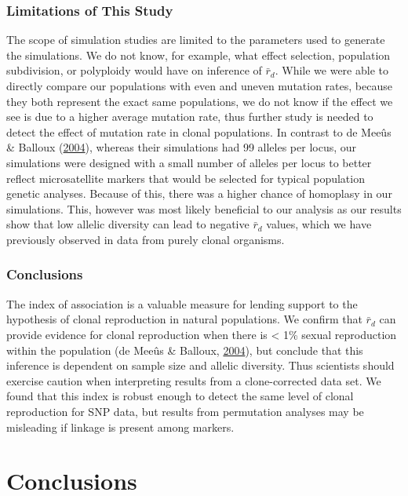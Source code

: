 \documentclass[double,11pt]{beavtex}
\begin{document}
  \subsection{Limitations of This Study}\label{limitations-of-this-study}
  
  The scope of simulation studies are limited to the parameters used to
  generate the simulations. We do not know, for example, what effect
  selection, population subdivision, or polyploidy would have on inference
  of \(\bar{r}_d\). While we were able to directly compare our populations
  with even and uneven mutation rates, because they both represent the
  exact same populations, we do not know if the effect we see is due to a
  higher average mutation rate, thus further study is needed to detect the
  effect of mutation rate in clonal populations. In contrast to de Meeûs
  \& Balloux (\protect\hyperlink{ref-de2004clonal}{2004}), whereas their
  simulations had 99 alleles per locus, our simulations were designed with
  a small number of alleles per locus to better reflect microsatellite
  markers that would be selected for typical population genetic analyses.
  Because of this, there was a higher chance of homoplasy in our
  simulations. This, however was most likely beneficial to our analysis as
  our results show that low allelic diversity can lead to negative
  \(\bar{r}_d\) values, which we have previously observed in data from
  purely clonal organisms.
  
  \subsection{Conclusions}\label{conclusions-1}
  
  The index of association is a valuable measure for lending support to
  the hypothesis of clonal reproduction in natural populations. We confirm
  that \(\bar{r}_d\) can provide evidence for clonal reproduction when
  there is \textless{} 1\% sexual reproduction within the population (de
  Meeûs \& Balloux, \protect\hyperlink{ref-de2004clonal}{2004}), but
  conclude that this inference is dependent on sample size and allelic
  diversity. Thus scientists should exercise caution when interpreting
  results from a clone-corrected data set. We found that this index is
  robust enough to detect the same level of clonal reproduction for SNP
  data, but results from permutation analyses may be misleading if linkage
  is present among markers.
  
  \chapter{Conclusions}\label{conclusions-2}
  
\end{document}
